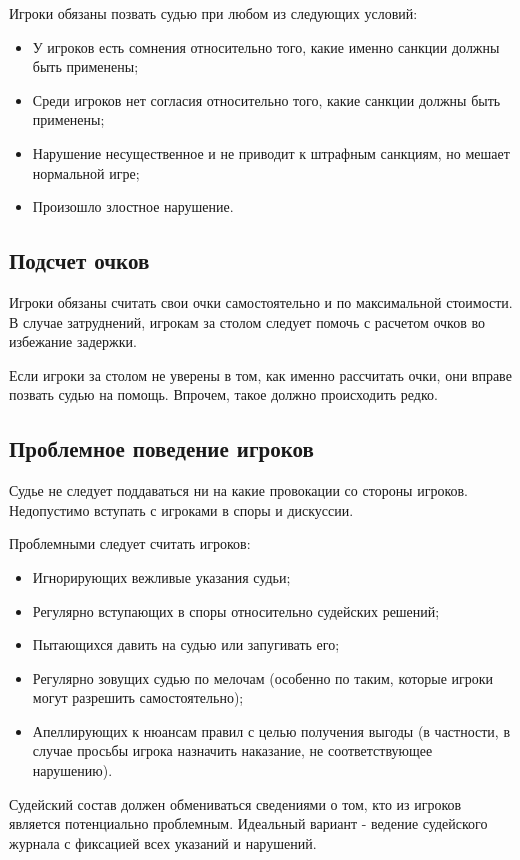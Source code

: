 Игроки обязаны позвать судью при любом из следующих условий:
\begin{itemize}
	\item У игроков есть сомнения относительно того, какие именно санкции должны быть применены;
	\item Среди игроков нет согласия относительно того, какие санкции должны быть применены;
	\item Нарушение несущественное и не приводит к штрафным санкциям, но мешает нормальной игре;
	\item Произошло злостное нарушение.
\end{itemize}

\subsection{Подсчет очков}

Игроки обязаны считать свои очки самостоятельно и по максимальной стоимости. В случае затруднений, игрокам за столом следует помочь с расчетом очков во избежание задержки.

Если игроки за столом не уверены в том, как именно рассчитать очки, они вправе позвать судью на помощь. Впрочем, такое должно происходить редко.

\subsection{Проблемное поведение игроков}

Судье не следует поддаваться ни на какие провокации со стороны игроков. Недопустимо вступать с игроками в споры и дискуссии. 

Проблемными следует считать игроков:
\begin{itemize}
	\item Игнорирующих вежливые указания судьи;
	\item Регулярно вступающих в споры относительно судейских решений;
	\item Пытающихся давить на судью или запугивать его;
	\item Регулярно зовущих судью по мелочам (особенно по таким, которые игроки могут разрешить самостоятельно);
	\item Апеллирующих к нюансам правил с целью получения выгоды (в частности, в случае просьбы игрока назначить наказание, не соответствующее нарушению).
\end{itemize}

Судейский состав должен обмениваться сведениями о том, кто из игроков является потенциально проблемным. Идеальный вариант - ведение судейского журнала с фиксацией всех указаний и нарушений.

